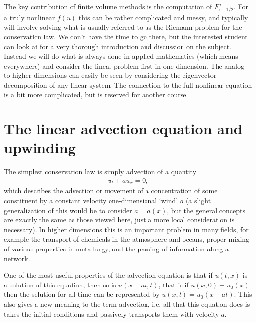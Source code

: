 The key contribution of finite volume methods is the computation of $F_{i-1/2}^n$.  For a truly nonlinear $f(u)$ this can be rather complicated and messy, and typically will involve solving what is usually referred to as the Riemann problem for the conservation law.  We don't have the time to go there, but the interested student can look at \cite{Le2002} for a very thorough introduction and discussion on the subject.  Instead we will do what is always done in applied mathematics (which means everywhere) and consider the linear problem first in one-dimension.  The analog to higher dimensions can easily be seen by considering the eigenvector decomposition of any linear system.  The connection to the full nonlinear equation is a bit more complicated, but is reserved for another course.

\section{The linear advection equation and upwinding}
The simplest conservation law is simply advection of a quantity
\begin{gather}
u_t + au_x = 0,
\end{gather}
which describes the advection or movement of a concentration of some constituent by a constant velocity one-dimensional `wind' $a$ (a slight generalization of this would be to consider $a=a(x)$, but the general concepts are exactly the same as those viewed here, just a more local consideration is necessary).  In higher dimensions this is an important problem in many fields, for example the transport of chemicals in the atmosphere and oceans, proper mixing of various properties in metallurgy, and the passing of information along a network.

One of the most useful properties of the advection equation is that if $u(t,x)$ is a solution of this equation, then so is $u(x-at,t)$, that is if $u(x,0) = u_0(x)$ then the solution for all time can be represented by $u(x,t) = u_0(x-at)$.  This also gives a new meaning to the term advection, i.e. all that this equation does is takes the initial conditions and passively transports them with velocity $a$.

